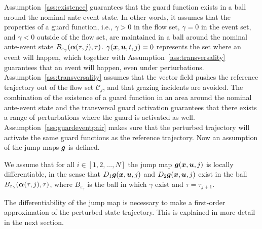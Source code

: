 \documentclass[../DC2017114Bouma.tex]{subfiles}
\begin{document}
Assumption~\ref{ass:existence} guarantees that the guard function exists in a ball around the nominal ante-event state. In other words, it assumes that the properties of a guard function, i.e., $\gamma>0$ in the flow set, $\gamma=0$ in the event set, and $\gamma<0$ outside of the flow set, are maintained in a ball around the nominal ante-event state $B_{\varepsilon_\gamma}(\boldsymbol{\alpha}(\tau,j),\tau)$.  $\gamma({\boldsymbol{x}},{\boldsymbol{u}},t,j) = 0$ represents the set where an event will happen, which together with Assumption~\ref{ass:transversality} guarantees that an event will happen, even under perturbations. Assumption~\ref{ass:transversality} assumes that the vector field pushes the reference trajectory out of the flow set $\mathcal{C}_j$, and that grazing incidents are avoided. The combination of the existence of a guard function in an area around the nominal ante-event state and the transversal guard activation guarantees that there exists a range of perturbations where the guard is activated as well. Assumption~\ref{ass:guardeventpair} makes sure that the perturbed trajectory will activate the same guard functions as the reference trajectory. Now an assumption of the jump maps ${\boldsymbol{g}}$ is defined.

\begin{myass}\label{ass:jump}
We assume that for all $i \in [1,2,...,N]$ the jump map ${\boldsymbol{g}}({\boldsymbol{x}},{\boldsymbol{u}},j)$ is locally differentiable, in the sense that $D_1{\boldsymbol{g}}({\boldsymbol{x}},{\boldsymbol{u}},j)$ and $D_2{\boldsymbol{g}}({\boldsymbol{x}},{\boldsymbol{u}},j)$ exist in the ball $B_{\varepsilon_{\gamma}}(\boldsymbol{\alpha}(\tau,j),\tau)$, where $B_{\varepsilon_{\gamma}}$ is the ball in which $\gamma$ exist and $\tau = \tau_{j+1}$.
\end{myass}

The differentiability of the jump map is necessary to make a first-order approximation of the perturbed state trajectory. This is explained in more detail in the next section.
\end{document}

